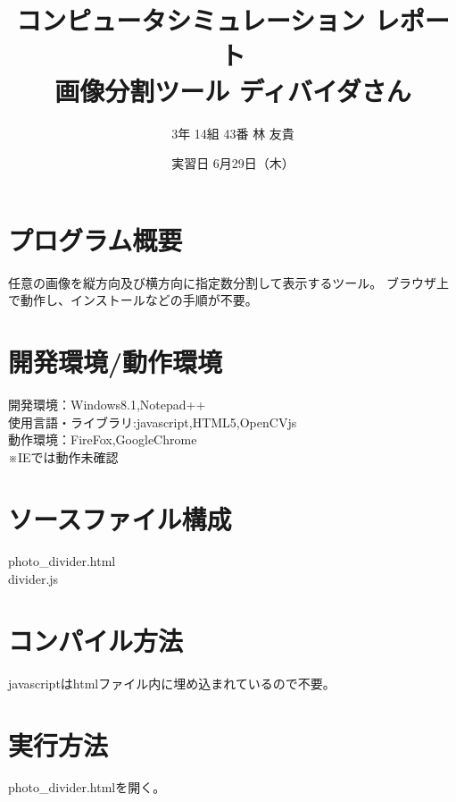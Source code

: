 \documentclass[a4j]{jsarticle}
\title{コンピュータシミュレーション レポート\\画像分割ツール ディバイダさん}
\title{}
\author{3年 14組 43番 林 友貴}
\date{実習日 6月29日（木）}
\begin{document}
\maketitle
\tableofcontents

\newpage

\section{プログラム概要}
任意の画像を縦方向及び横方向に指定数分割して表示するツール。
ブラウザ上で動作し、インストールなどの手順が不要。

\section{開発環境/動作環境}
\noindent
開発環境：Windows8.1,Notepad++\\
使用言語・ライブラリ:javascript,HTML5,OpenCVjs\\
動作環境：FireFox,GoogleChrome\\
※IEでは動作未確認
\section{ソースファイル構成}
\noindent
photo\_divider.html\\
divider.js\\

\section{コンパイル方法}
javascriptはhtmlファイル内に埋め込まれているので不要。
\section{実行方法}
photo\_divider.htmlを開く。
\end{document}
